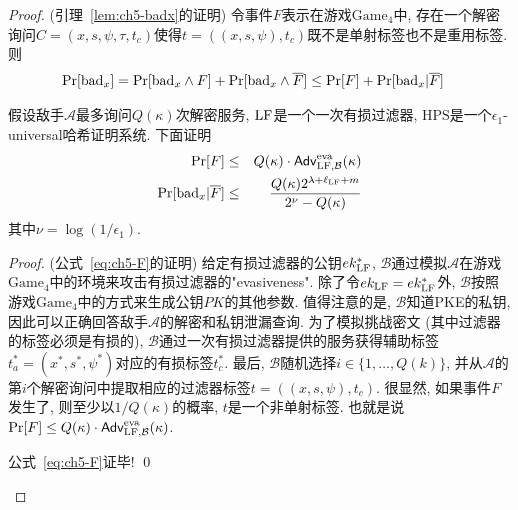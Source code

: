 \begin{proof}{(引理~\ref{lem:ch5-badx}的证明)}
令事件$F$表示在游戏$\text{Game}_4$中, 存在一个解密询问$C=(x, s, \psi,\tau, t_c)$使得$t=((x, s, \psi), t_c)$既不是单射标签也不是重用标签. 则
\[
\begin{aligned}
\textup{Pr}[\text{bad}_{x}] & =\textup{Pr}[\text{bad}_{x}\land F] + \textup{Pr}[\text{bad}_{x} \land  \overline{F}] \leq \textup{Pr}[F]+\textup{Pr}[\text{bad}_{x} | \overline{F}]
\end{aligned}
\]

假设敌手$\mathcal{A}$最多询问$Q(\kappa)$次解密服务, $\text{LF}$是一个一次有损过滤器, $\text{HPS}$是一个$\epsilon_1$-universal哈希证明系统. 下面证明
\begin{eqnarray}
\textup{Pr}[F] &\leq &Q(\kappa)\cdot\mathsf{Adv}_{\text{LF},\mathcal{B}}^{\textup{eva}}(\kappa) \label{eq:ch5-F}\\
\textup{Pr}[\text{bad}_x | \overline{F}] &\leq & \dfrac{Q(\kappa)2^{\lambda+\ell_{\text{LF}} + m}}{2^\nu-Q(\kappa)}\label{eq:ch5-rejection}
\end{eqnarray}
其中$\nu=\log(1/\epsilon_1)$.

\begin{proof}{(公式~\eqref{eq:ch5-F}的证明)}
给定有损过滤器的公钥$ek_{\text{LF}}^*$, $\mathcal{B}$通过模拟$\mathcal{A}$在游戏$\text{Game}_4$中的环境来攻击有损过滤器的"evasiveness". 除了令$ek_{\text{LF}} = ek_{\text{LF}}^*$外, $\mathcal{B}$按照游戏$\text{Game}_4$中的方式来生成公钥$PK$的其他参数. 值得注意的是, $\mathcal{B}$知道PKE的私钥, 因此可以正确回答敌手$\mathcal{A}$的解密和私钥泄漏查询. 为了模拟挑战密文 (其中过滤器的标签必须是有损的), $\mathcal{B}$通过一次有损过滤器提供的服务获得辅助标签$t_a^* = (x^*, s^*, \psi^*)$对应的有损标签$t_c^*$. 最后, $\mathcal{B}$随机选择$i \in \{1, \ldots, Q(k)\}$, 并从$\mathcal{A}$的第$i$个解密询问中提取相应的过滤器标签$t=((x, s, \psi), t_c)$. 很显然, 如果事件$F$发生了, 则至少以$1/Q(\kappa)$的概率, $t$是一个非单射标签. 也就是说$\textup{Pr}[F]\leq Q(\kappa)\cdot\mathsf{Adv}_{\text{LF},\mathcal{B}}^{\textup{eva}}(\kappa)$. 

公式~\eqref{eq:ch5-F}证毕! \qed
\end{proof}


\end{proof}
